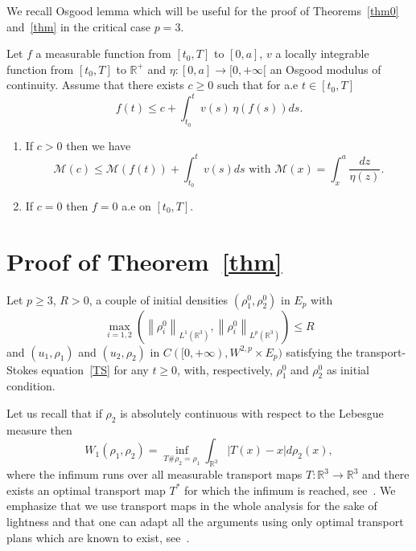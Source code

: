 \documentclass[AHL,Unicode,longabstracts,published]{cedram}
\newcommand{\R}{\mathbb{R}}
\newcommand{\clM}{\mathcal{M}}
\renewcommand{\leq}{\leqslant}
\renewcommand{\geq}{\geqslant}
\begin{document}
We recall Osgood lemma which will be useful for the proof of Theorems~\ref{thm0} and~\ref{thm} in the critical case $p=3$.

\begin{lemm}\label{Osgood}
Let $f$ a measurable function from $[t_0,T]$ to $[0,a]$, $v$ a locally integrable function from $[t_0,T]$ to $\R^+$ and $ \eta: [0,a] \to [0,+\infty[$ an Osgood modulus of continuity. Assume that there exists $c \geq0$ such that for a.e $t\in[t_0,T]$
\[
f(t) \leq c+\int_{t_0}^t v(s)\, \eta(f(s)) ds.
\]
\begin{enumerate}
\item\label{lemm3.8.1} If $c>0$ then we have
\[
\clM(c) \leq \clM(f(t)) + \int_{t_0}^t v(s) ds \text{ with } \clM(x)=\int_x^a \frac{dz}{\eta(z)}.
\]
\item\label{lemm3.8.2} If $c=0$ then $f=0$ a.e on $[t_0,T]$.
\end{enumerate}
\end{lemm}



\section{Proof of Theorem~\ref{thm} }\label{sec-stabb}

Let $p\geq 3$, $R>0$, a couple of initial densities
$ (\rho_1^0, \rho_2^0)$ in $E_p $ with
\[
\max_{i=1,2} \left(\left\|\rho_i^0\right\|_{ L^1\left(\R^3\right)}, \left\|\rho_i^0\right\|_{ L^p \left(\R^3\right)}\right) \leq R
\]
and $ (u_1,\rho_1) $ and $ (u_2,\rho_2) $ in $C([0,+\infty),W^{2,p} \times E_p)$ satisfying the transport-Stokes equation~\eqref{TS} for any $t\geq 0$, with, respectively, $ \rho_1^0 $ and $\rho_2^0 $ as initial condition.


Let us recall that if $\rho_2$ is absolutely continuous with respect to the Lebesgue measure then
\begin{equation}\label{W-infi}
W_1 (\rho_1,\rho_2)= \underset{T\# \rho_2=\rho_1} \inf \int_{\R^3} |T(x)-x|d\rho_2(x),
\end{equation}
where the infimum runs over all measurable transport maps $T : \R^3 \to \R^3$ and there exists an optimal transport map $T^*$ for which the infimum is reached, see~\cite[Theorem~1.5]{Santambrogio}. We emphasize that we use transport maps in the whole analysis for the sake of lightness and that one can adapt all the arguments using only optimal transport plans which are known to exist, see~\cite[Theorem~1.7]{Santambrogio_book}.
\end{document}
